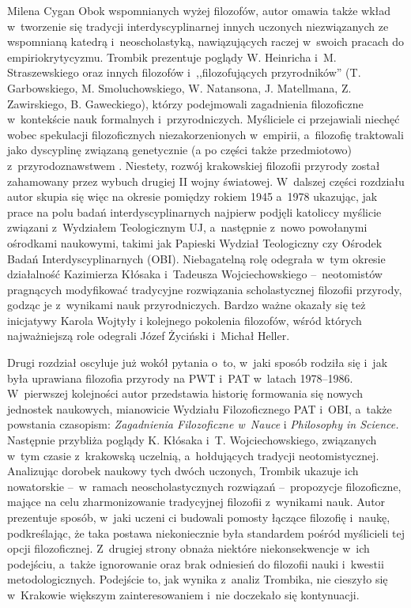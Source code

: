 \begin{newrevplenv}{Milena Cygan}
Obok wspomnianych wyżej filozofów, autor omawia także wkład w~tworzenie się tradycji interdyscyplinarnej innych uczonych niezwiązanych ze wspomnianą katedrą i~neoscholastyką, nawiązujących raczej w~swoich pracach do empiriokrytycyzmu. Trombik prezentuje poglądy W. Heinricha i~M. Straszewskiego oraz innych filozofów i~,,filozofujących przyrodników'' (T. Garbowskiego, M. Smoluchowskiego, W. Natansona, J. Matellmana, Z. Zawirskiego, B. Gaweckiego), którzy podejmowali zagadnienia filozoficzne w~kontekście nauk formalnych i~przyrodniczych. Myśliciele ci przejawiali niechęć wobec spekulacji filozoficznych niezakorzenionych w~empirii, a~filozofię traktowali jako dyscyplinę związaną genetycznie (a po części także przedmiotowo) z~przyrodoznawstwem
\parencite[][s.~86]{trombik_koncepcje_2021}. %
 Niestety, rozwój krakowskiej filozofii przyrody został zahamowany przez wybuch drugiej II wojny światowej. W~dalszej części rozdziału autor skupia się więc na okresie pomiędzy rokiem 1945 a~1978 ukazując, jak prace na polu badań interdyscyplinarnych najpierw podjęli katoliccy myślicie związani z~Wydziałem Teologicznym UJ, a~następnie z~nowo powołanymi ośrodkami naukowymi, takimi jak Papieski Wydział Teologiczny czy Ośrodek Badań Interdyscyplinarnych (OBI). Niebagatelną rolę odegrała w~tym okresie działalność Kazimierza Kłósaka i~Tadeusza Wojciechowskiego --~neotomistów pragnących modyfikować tradycyjne rozwiązania scholastycznej filozofii przyrody, godząc je z~wynikami nauk przyrodniczych. Bardzo ważne okazały się też inicjatywy Karola Wojtyły i kolejnego pokolenia filozofów, wśród których najważniejszą role odegrali Józef Życiński i~Michał Heller.

Drugi rozdział oscyluje już wokół pytania o~to, w~jaki sposób rodziła się i~jak była uprawiana filozofia przyrody na PWT i~PAT w~latach 1978--1986. W~pierwszej kolejności autor przedstawia historię formowania się nowych jednostek naukowych, mianowicie Wydziału Filozoficznego PAT i~OBI, a~także powstania czasopism: \textit{Zagadnienia Filozoficzne w~Nauce} i \textit{Philosophy in Science.} Następnie przybliża poglądy K. Kłósaka i~T. Wojciechowskiego, związanych w~tym czasie z~krakowską uczelnią, a~hołdujących tradycji neotomistycznej. Analizując dorobek naukowy tych dwóch uczonych, Trombik ukazuje ich nowatorskie --~w~ramach neoscholastycznych rozwiązań --~propozycje filozoficzne, mające na celu zharmonizowanie tradycyjnej filozofii z~wynikami nauk. Autor prezentuje sposób, w~jaki uczeni ci budowali pomosty łączące filozofię i~naukę, podkreślając, że taka postawa niekoniecznie była standardem pośród myślicieli tej opcji filozoficznej. Z~drugiej strony obnaża niektóre niekonsekwencje w~ich podejściu, a~także ignorowanie oraz brak odniesień do filozofii nauki i~kwestii metodologicznych. Podejście to, jak wynika z~analiz Trombika, nie cieszyło się w~Krakowie większym zainteresowaniem i~nie doczekało się kontynuacji.


\end{newrevplenv}
